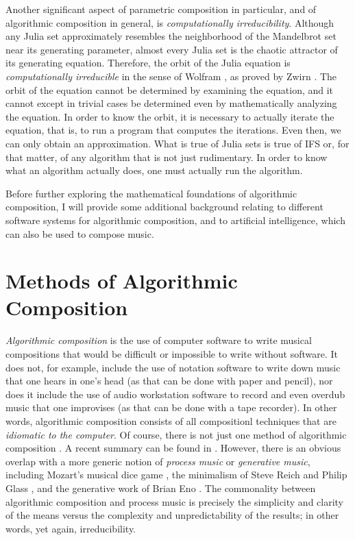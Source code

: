 \documentclass[11pt]{scrartcl}
\begin{document}
Another significant aspect of parametric composition in particular, and of algorithmic composition in general, is \emph{computationally irreducibility}. Although any Julia set approximately resembles the neighborhood of the Mandelbrot set near its generating parameter, almost every Julia set is the chaotic attractor of its generating equation. Therefore, the orbit of the Julia equation is \emph{computationally irreducible} in the sense of Wolfram \parencite{wolfram1985undecidability}, as proved by Zwirn \parencite{zwirn2015computational}. The orbit of the equation cannot be determined by examining the equation, and it cannot except in trivial cases be determined even by mathematically analyzing the equation. In order to know the orbit, it is necessary to actually iterate the equation, that is, to run a program that computes the iterations. Even then, we can only obtain an approximation. What is true of Julia sets is true of IFS or, for that matter, of any algorithm that is not just rudimentary. In order to know what an algorithm actually does, one must actually run the algorithm.

Before further exploring the mathematical foundations of algorithmic composition, I will provide some additional background relating to different software systems for algorithmic composition, and to artificial intelligence, which can also be used to compose music.

\section*{Methods of Algorithmic Composition}

\emph{Algorithmic composition} is the use of computer software to write musical compositions that would be difficult or impossible to write without software. It does not, for example, include the use of notation software to write down music that one hears in one's head (as that can be done with paper and pencil), nor does it include the use of audio workstation software to record and even overdub music that one improvises (as that can be done with a tape recorder). In other words, algorithmic composition consists of all compositionl techniques that are \emph{idiomatic to the computer}. Of course, there is not just one method of algorithmic composition \parencite{fernandez2013ai, arizanet}. A recent summary can be found in \parencite{mclean2018oxford}. However, there is an obvious overlap with a more generic notion of \emph{process music} or \emph{generative music}, including Mozart's musical dice game \parencite{humdrumdice}, the minimalism of Steve Reich \parencite{reichprocess, 10.2307/832600} and Philip Glass \parencite{potter2002four, glass2015words}, and the generative work of Brian Eno \parencite{eno1996generative}. The commonality between algorithmic composition and process music is precisely the simplicity and clarity of the means versus the complexity and unpredictability of the results; in other words, yet again, irreducibility. 
\end{document}
